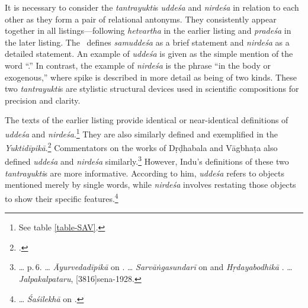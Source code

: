 It is necessary to consider the \emph{tantrayukti}s 
\emph{uddeśa} and \emph{nirdeśa} in relation to each other 
as they form a pair of relational antonyms. 
They consistently appear together in all listings---following \emph{hetvartha} 
in the earlier listing and \emph{pradeśa} in the later listing. 
The \SS\ defines \emph{samuddeśa} as a brief statement 
and \emph{nirdeśa} as a detailed statement. 
An example of \emph{uddeśa} is given as the simple mention of the word “.” 
In contrast, the example of \emph{nirdeśa} is the phrase “in the body or exogenous,” 
where spike is described in more detail as being of two kinds. 
These two \emph{tantrayukti}s are stylistic structural devices 
used in scientific compositions for precision and clarity.

The texts of the earlier listing provide identical or near-identical definitions 
of \emph{uddeśa} and \emph{nirdeśa}.\footnote{See table \ref{table-SAV}.} 
They are also similarly defined and exemplified in the \emph{Yuktidīpikā}.\footcite[7]{wezl-1998} 
Commentators on the works of Dṛḍhabala and Vāgbhaṭa 
also defined \emph{uddeśa} and \emph{nirdeśa} similarly.\footnote{%
	\ldots
		 p.\,6.	
	\ldots
		\emph{Āyurvedadīpikā} on . 
	\ldots
		\emph{Sarvāṅgasundarī} on  and 
		\emph{Hṛdayabodhikā} \parencite[2]{muss-1940}.
	\ldots
		\emph{Jalpakalpataru}, {sena-1928}.
	} 
However, Indu's definitions of these two \emph{tantrayukti}s are more informative. 
According to him, \emph{uddeśa} refers to objects mentioned merely by single words, 
while \emph{nirdeśa} involves restating those objects to show their specific features.\footnote{%
	\ldots
		\emph{Śaśilekhā} on .
	}

